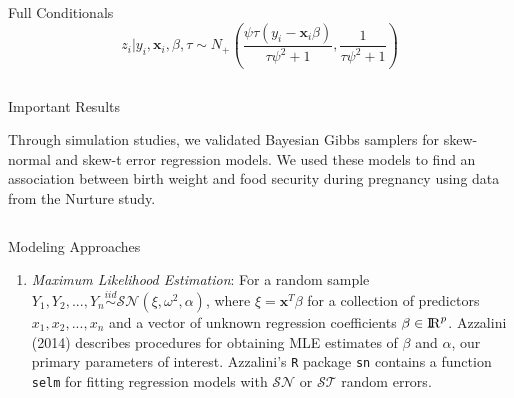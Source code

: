 \documentclass[final]{beamer}
\newlength{\onecolwid}
\newlength{\twocolwid}
\begin{document}
\begin{frame}[t]
\begin{columns}[t]
\begin{column}{\twocolwid}
\begin{columns}[t,totalwidth=\twocolwid]
\begin{column}{\onecolwid}
\begin{block}{Full Conditionals}
$$z_i|y_i,\mathbf{x}_i,\beta,\tau \sim N_+(\frac{\psi \tau(y_i -  \mathbf{x}_i\beta)}{\tau \psi^2 +1},\frac{1}{\tau\psi^2+1})$$

\end{block}


\end{column} %

\end{columns} %


\begin{alertblock}{Important Results}

Through simulation studies, we validated Bayesian Gibbs samplers for skew-normal and skew-t error regression models. We used these models to find an association between birth weight and food security during pregnancy using data from the Nurture study.  

\end{alertblock} 


\begin{columns}[t,totalwidth=\twocolwid] %

\begin{column}{\onecolwid} %


\begin{block}{Modeling Approaches}

\begin{enumerate}
\item \textit{Maximum Likelihood Estimation}: For a random sample $Y_1,Y_2,...,Y_n \stackrel{iid}{\sim} \mathcal{SN}(\xi,\omega^2,\alpha)$, where $\xi = \mathbf{x}^T\beta$ for a collection of predictors $x_1,x_2,...,x_n$ and a vector of unknown regression coefficients $\beta \in {\rm I\!R}^p$. Azzalini (2014) describes procedures for obtaining MLE estimates of $\beta$ and $\alpha$, our primary parameters of interest. Azzalini's {\tt R} package {\tt sn} contains a function {\tt selm} for fitting regression models with $\mathcal{SN}$ or $\mathcal{ST}$ random errors.


\end{enumerate}
\end{block}
\end{column}
\end{columns}
\end{column}
\end{columns}
\end{frame}
\end{document}
